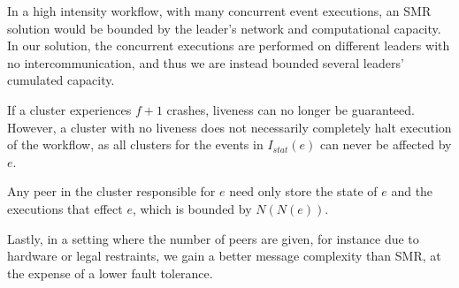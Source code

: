 \documentclass{article}
\begin{document}
    In a high intensity workflow, with many concurrent event executions, an SMR solution would be bounded by the leader's network and computational capacity.
    In our solution, the concurrent executions are performed on different leaders with no intercommunication, and thus we are instead bounded several leaders' cumulated capacity.

    If a cluster experiences $f+1$ crashes, liveness can no longer be guaranteed. 
    However, a cluster with no liveness does not necessarily completely halt execution of the workflow, as all clusters for the events in $I_{stat}(e)$ can never be affected by $e$. 

    Any peer in the cluster responsible for $e$ need only store the state of $e$ and the executions that effect $e$, which is bounded by $N(N(e))$.

    Lastly, in a setting where the number of peers are given, for instance due to hardware or legal restraints, we gain a better message complexity than SMR, at the expense of a lower fault tolerance. 


\end{document}
